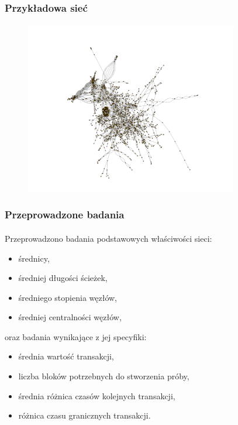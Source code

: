 \documentclass[]{beamer}
\newcommand{\frameheight}{7.5cm}
\begin{document}
\begin{frame}
 \frametitle{Przykładowa sieć}
 \framesubtitle{}
  \begin{figure}
	\centering
 \includegraphics[height=\frameheight]{pictures/graph/graph.png}
  \end{figure}
\end{frame}


\begin{frame}
 \frametitle{Przeprowadzone badania}
 \framesubtitle{}
 \justify
Przeprowadzono badania podstawowych właściwości sieci:
\begin{itemize}
\item średnicy,
\item średniej długości ścieżek,
\item średniego stopienia węzłów,
\item średniej centralności węzłów,
\end{itemize}
oraz badania wynikające z jej specyfiki:
\begin{itemize}
\item średnia wartość transakcji,
\item liczba bloków potrzebnych do stworzenia próby,
\item średnia różnica czasów kolejnych transakcji,
\item różnica czasu granicznych transakcji.
\end{itemize}
\end{frame}
\end{document}
